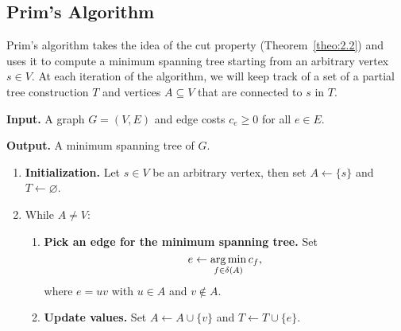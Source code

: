 \subsection{Prim's Algorithm}\label{subsec:2.3}
Prim's algorithm takes the idea of the cut property (Theorem~\ref{theo:2.2}) 
and uses it to compute a minimum spanning tree starting from an arbitrary 
vertex $s \in V$. At each iteration of the algorithm, we will keep track of a 
set of a partial tree construction $T$ and vertices $A \subseteq V$ that are 
connected to $s$ in $T$. 

\begin{mdframed}[
    linewidth=1pt,
    linecolor=black,
    bottomline=false,topline=false,rightline=false,
    innerrightmargin=0pt,innertopmargin=0pt,innerbottommargin=0pt,
    innerleftmargin=1em,%
    skipabove=0.75\baselineskip
]
{\bf Input.} A graph $G = (V, E)$ and edge costs $c_e \geq 0$ for 
all $e \in E$. 

{\bf Output.} A minimum spanning tree of $G$.
\begin{enumerate}[leftmargin=1.75cm, label={Step \arabic*.}]
    \item {\bf Initialization.} Let $s \in V$ be an arbitrary vertex, 
    then set $A \gets \{s\}$ and $T \gets \varnothing$.

    \item While $A \neq V$:
    \begin{enumerate}[label={Step 2.\arabic*.}]
        \item {\bf Pick an edge for the minimum spanning tree.} 
        Set 
        \[ e \gets \operatorname*{arg\,min}_{f \in \delta(A)} c_f, \] 
        where $e = uv$ with $u \in A$ and $v \notin A$.  
        \item {\bf Update values.} Set $A \gets A \cup \{v\}$ and 
        $T \gets T \cup \{e\}$. 
    \end{enumerate}
\end{enumerate}
\end{mdframed}\vspace{-0.15cm}


